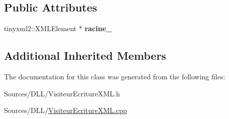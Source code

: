 \subsection*{Public Attributes}
\begin{DoxyCompactItemize}
\item 
\hypertarget{class_visiteur_ecriture_x_m_l_a40b822db4ca8fb0b9d9fa2801562ad03}{}\label{class_visiteur_ecriture_x_m_l_a40b822db4ca8fb0b9d9fa2801562ad03} 
tinyxml2\+::\+X\+M\+L\+Element $\ast$ {\bfseries racine\+\_\+}
\end{DoxyCompactItemize}
\subsection*{Additional Inherited Members}


The documentation for this class was generated from the following files\+:\begin{DoxyCompactItemize}
\item 
Sources/\+D\+L\+L/Visiteur\+Ecriture\+X\+M\+L.\+h\item 
Sources/\+D\+L\+L/\hyperlink{_visiteur_ecriture_x_m_l_8cpp}{Visiteur\+Ecriture\+X\+M\+L.\+cpp}\end{DoxyCompactItemize}
